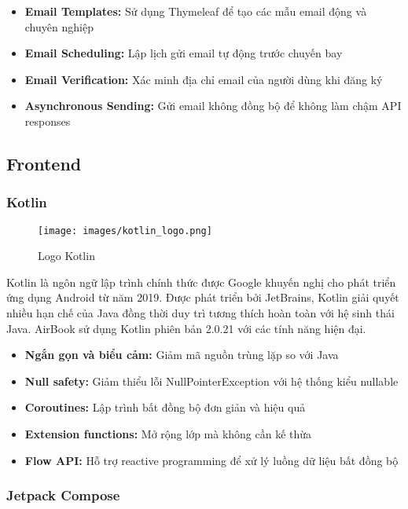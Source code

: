 \begin{itemize}[leftmargin=1cm]
    \item \textbf{Email Templates:} Sử dụng Thymeleaf để tạo các mẫu email động và chuyên nghiệp
    \item \textbf{Email Scheduling:} Lập lịch gửi email tự động trước chuyến bay
    \item \textbf{Email Verification:} Xác minh địa chỉ email của người dùng khi đăng ký
    \item \textbf{Asynchronous Sending:} Gửi email không đồng bộ để không làm chậm API responses
\end{itemize}


\subsection{Frontend}

\subsubsection{Kotlin}

\begin{figure}[H]
\centering
\texttt{[image: images/kotlin\_logo.png]}
\caption{Logo Kotlin}
\end{figure}

Kotlin là ngôn ngữ lập trình chính thức được Google khuyến nghị cho phát triển ứng dụng Android từ năm 2019. Được phát triển bởi JetBrains, Kotlin giải quyết nhiều hạn chế của Java đồng thời duy trì tương thích hoàn toàn với hệ sinh thái Java. AirBook sử dụng Kotlin phiên bản 2.0.21 với các tính năng hiện đại.

\begin{itemize}[leftmargin=1cm]
    \item \textbf{Ngắn gọn và biểu cảm:} Giảm mã nguồn trùng lặp so với Java
    \item \textbf{Null safety:} Giảm thiểu lỗi NullPointerException với hệ thống kiểu nullable
    \item \textbf{Coroutines:} Lập trình bất đồng bộ đơn giản và hiệu quả
    \item \textbf{Extension functions:} Mở rộng lớp mà không cần kế thừa
    \item \textbf{Flow API:} Hỗ trợ reactive programming để xử lý luồng dữ liệu bất đồng bộ
\end{itemize}

\subsubsection{Jetpack Compose}


